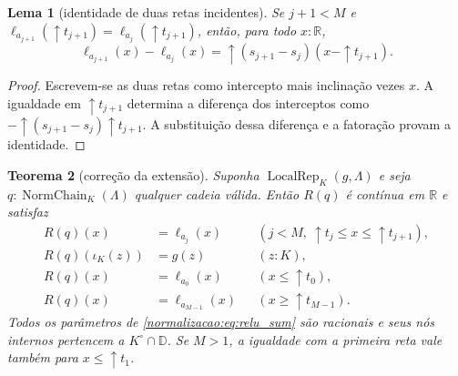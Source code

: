\documentclass[12pt,a4paper]{article}
\theoremstyle{preciso}
\newtheorem{teorema}{Teorema}[section]
\newtheorem{lema}[teorema]{Lema}
\theoremstyle{definition}
\newcommand{\R}{\mathbb R}
\newcommand{\D}{\mathbb D}
\newcommand{\Loc}{\operatorname{LocalRep}}
\theoremstyle{preciso}
\theoremstyle{preciso}
\theoremstyle{preciso}
\theoremstyle{preciso}
\theoremstyle{definition}
\theoremstyle{preciso}
\theoremstyle{definition}
\theoremstyle{preciso}
\theoremstyle{preciso}
\theoremstyle{definition}
\begin{document}
\begin{lema}[identidade de duas retas incidentes]\label{map:normalizacao:8.3}\label{normalizacao:lem:incident}
Se $j+1<M$ e
$\ell_{a_{j+1}}(\uparrow t_{j+1})=
 \ell_{a_j}(\uparrow t_{j+1})$, então, para todo $x:\R$,
\[
 \ell_{a_{j+1}}(x)-\ell_{a_j}(x)
   =\uparrow(s_{j+1}-s_j)(x-\uparrow t_{j+1}).
\]
\end{lema}
\begin{proof}
Escrevem-se as duas retas como intercepto mais inclinação vezes $x$.
A igualdade em $\uparrow t_{j+1}$ determina a diferença dos
interceptos como $-\uparrow(s_{j+1}-s_j)\uparrow t_{j+1}$.
A substituição dessa diferença e a fatoração provam a identidade.
\end{proof}

\begin{teorema}[correção da extensão]\label{map:normalizacao:8.4}\label{normalizacao:thm:extension}
Suponha $\Loc_K(g,\Lambda)$ e seja
$q:\operatorname{NormChain}_K(\Lambda)$ qualquer cadeia válida.
Então $R(q)$ é contínua em $\R$ e satisfaz
\begin{align*}
 R(q)(x)&=\ell_{a_j}(x)
            &&(j<M,\ \uparrow t_j\le x\le\uparrow t_{j+1}),\\
 R(q)(\iota_K(z))&=g(z)&& (z:K),\\
 R(q)(x)&=\ell_{a_0}(x)&& (x\le\uparrow t_0),\\
 R(q)(x)&=\ell_{a_{M-1}}(x)&& (x\ge\uparrow t_{M-1}).
\end{align*}
Todos os parâmetros de \eqref{normalizacao:eq:relu_sum} são racionais e seus
nós internos pertencem a $K^\circ\cap\D$. Se $M>1$, a igualdade
com a primeira reta vale também para $x\le\uparrow t_1$.
\end{teorema}
\end{document}
